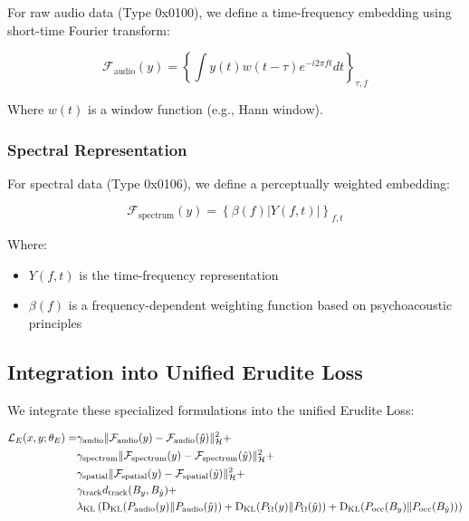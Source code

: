 For raw audio data (Type 0x0100), we define a time-frequency embedding using short-time Fourier transform:

\begin{equation}
\mathcal{F}_{\text{audio}}(y) = \left\{ \int y(t) w(t-\tau) e^{-i2\pi ft} dt \right\}_{\tau,f}
\end{equation}

Where $w(t)$ is a window function (e.g., Hann window).

\subsubsection{Spectral Representation}

For spectral data (Type 0x0106), we define a perceptually weighted embedding:

\begin{equation}
\mathcal{F}_{\text{spectrum}}(y) = \left\{ \beta(f) |Y(f,t)| \right\}_{f,t}
\end{equation}

Where:
\begin{itemize}
\item $Y(f,t)$ is the time-frequency representation
\item $\beta(f)$ is a frequency-dependent weighting function based on psychoacoustic principles
\end{itemize}

\subsection{Integration into Unified Erudite Loss}

We integrate these specialized formulations into the unified Erudite Loss:

\begin{equation}
\begin{aligned}
\mathcal{L}_E(x, y; \theta_E) = &\gamma_{\text{audio}} \|\mathcal{F}_{\text{audio}}(y) - \mathcal{F}_{\text{audio}}(\hat{y})\|_{\mathcal{H}}^2 + \\
&\gamma_{\text{spectrum}} \|\mathcal{F}_{\text{spectrum}}(y) - \mathcal{F}_{\text{spectrum}}(\hat{y})\|_{\mathcal{H}}^2 + \\
&\gamma_{\text{spatial}} \|\mathcal{F}_{\text{spatial}}(y) - \mathcal{F}_{\text{spatial}}(\hat{y})\|_{\mathcal{H}}^2 + \\
&\gamma_{\text{track}} d_{\text{track}}(B_y, B_{\hat{y}}) + \\
&\lambda_{\text{KL}} \left( \mathrm{D_{KL}}(P_{\text{audio}}(y) \| P_{\text{audio}}(\hat{y})) + \mathrm{D_{KL}}(P_{\Omega}(y) \| P_{\Omega}(\hat{y})) + \mathrm{D_{KL}}(P_{\text{occ}}(B_y) \| P_{\text{occ}}(B_{\hat{y}})) \right)
\end{aligned}
\end{equation}

